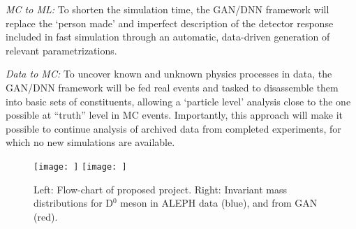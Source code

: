 \textit{MC to ML:} To shorten the simulation time, the GAN/DNN framework will replace the `person made' and imperfect description of the detector response included in fast simulation through an automatic, data-driven generation of relevant parametrizations.

\textit{Data to MC:} To uncover known and unknown physics processes in data, the GAN/DNN framework will be fed real events and tasked to disassemble them into basic sets of constituents, allowing a `particle level' analysis close to the one possible at ``truth'' level in MC events. Importantly, this approach will make it possible to continue analysis of archived data  from completed experiments, for which no new simulations are available.


\begin{figure}[!ht]
\vspace{-0.4cm}
\begin{center}
\texttt{[image: ]}
\hspace{0.03\textwidth}
\texttt{[image: ]}
\vspace{-0.5cm}
\caption{Left: Flow-chart of proposed project. Right: Invariant mass distributions for D$^0$ meson in {\eecol} ALEPH data (blue), and from GAN (red).}
\label{fig:concept}
\end{center}
\end{figure}
\vspace{-0.8cm}

